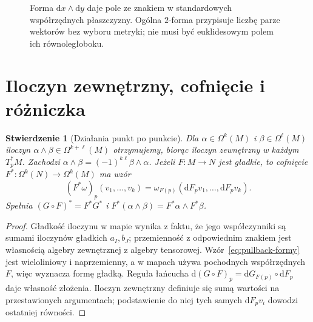 \documentclass[11pt,a4paper,oneside]{report}
\newcommand{\dd}{\mathrm d}
\theoremstyle{plain}
\newtheorem{stwierdzenie}[twierdzenie]{Stwierdzenie}
\theoremstyle{definition}
\theoremstyle{remark}
\begin{document}
\begin{figure}[!htbp]
\centering
{}
\caption{Forma $\dd x\wedge\dd y$ daje pole ze znakiem
w standardowych współrzędnych płaszczyzny. Ogólna $2$-forma
przypisuje liczbę parze wektorów bez wyboru metryki;
nie musi być euklidesowym polem ich równoległoboku.}
\label{fig:forma-zorientowane-pole}
\end{figure}

\section{Iloczyn zewnętrzny, cofnięcie i różniczka}
\label{sec:formy-dzialania}

\begin{stwierdzenie}[Działania punkt po punkcie]
\label{prop:formy-wedge-pullback}
Dla $\alpha\in\Omega^k(M)$ i $\beta\in\Omega^\ell(M)$
iloczyn $\alpha\wedge\beta\in\Omega^{k+\ell}(M)$
otrzymujemy, biorąc iloczyn zewnętrzny w każdym
$T_p^*M$. Zachodzi $\alpha\wedge\beta
=(-1)^{k\ell}\beta\wedge\alpha$.
Jeżeli $F:M\to N$ jest gładkie, to \emph{cofnięcie}
$F^*:\Omega^k(N)\to\Omega^k(M)$ ma wzór
\begin{equation}\label{eq:pullback-formy}
 (F^*\omega)_p(v_1,\ldots,v_k)
 =\omega_{F(p)}(\dd F_pv_1,\ldots,\dd F_pv_k).
\end{equation}
Spełnia $(G\circ F)^*=F^*G^*$ i
$F^*(\alpha\wedge\beta)=F^*\alpha\wedge F^*\beta$.
\end{stwierdzenie}
\begin{proof}
Gładkość iloczynu w mapie wynika z faktu, że jego
współczynniki są sumami iloczynów gładkich $a_I,b_J$;
przemienność z odpowiednim znakiem jest własnością
algebry zewnętrznej z algebry tensorowej.
Wzór~\eqref{eq:pullback-formy} jest wieloliniowy i
naprzemienny, a w mapach używa pochodnych współrzędnych
$F$, więc wyznacza formę gładką. Reguła łańcucha
$\dd(G\circ F)_p=\dd G_{F(p)}\circ\dd F_p$
daje własność złożenia. Iloczyn zewnętrzny definiuje
się sumą wartości na przestawionych argumentach; podstawienie
do niej tych samych $\dd F_pv_i$ dowodzi ostatniej równości.
\end{proof}
\end{document}
